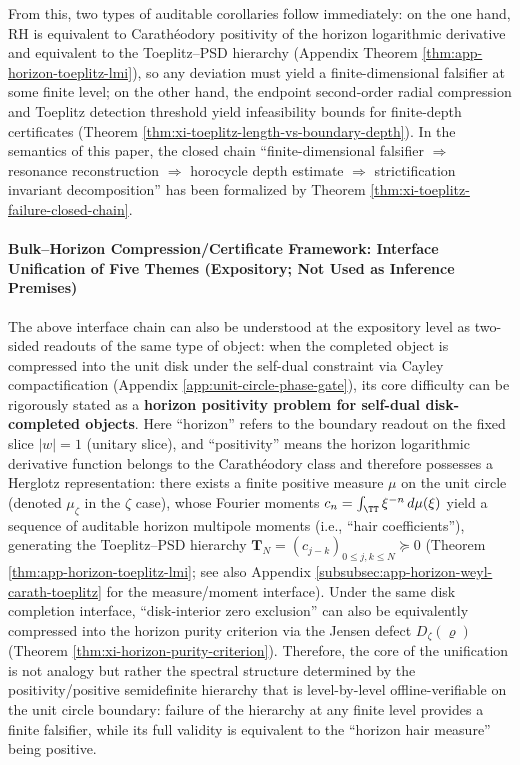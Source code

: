 From this, two types of auditable corollaries follow immediately: on the one hand, RH is equivalent to Carath\'eodory positivity of the horizon logarithmic derivative and equivalent to the Toeplitz--PSD hierarchy (Appendix Theorem \ref{thm:app-horizon-toeplitz-lmi}), so any deviation must yield a finite-dimensional falsifier at some finite level; on the other hand, the endpoint second-order radial compression and Toeplitz detection threshold yield infeasibility bounds for finite-depth certificates (Theorem \ref{thm:xi-toeplitz-length-vs-boundary-depth}).
In the semantics of this paper, the closed chain ``finite-dimensional falsifier \(\Rightarrow\) resonance reconstruction \(\Rightarrow\) horocycle depth estimate \(\Rightarrow\) strictification invariant decomposition'' has been formalized by Theorem \ref{thm:xi-toeplitz-failure-closed-chain}.

\paragraph{Bulk--Horizon Compression/Certificate Framework: Interface Unification of Five Themes (Expository; Not Used as Inference Premises)}
The above interface chain can also be understood at the expository level as two-sided readouts of the same type of object: when the completed object is compressed into the unit disk under the self-dual constraint via Cayley compactification (Appendix \ref{app:unit-circle-phase-gate}), its core difficulty can be rigorously stated as a \textbf{horizon positivity problem for self-dual disk-completed objects}.
Here ``horizon'' refers to the boundary readout on the fixed slice \(|w|=1\) (unitary slice), and ``positivity'' means the horizon logarithmic derivative function belongs to the Carath\'eodory class and therefore possesses a Herglotz representation: there exists a finite positive measure \(\mu\) on the unit circle (denoted \(\mu_{\zeta}\) in the \(\zeta\) case), whose Fourier moments
\(
c_n=\int_{\TT}\xi^{-n}\,d\mu(\xi)
\)
yield a sequence of auditable horizon multipole moments (i.e., ``hair coefficients''), generating the Toeplitz--PSD hierarchy
\(
\mathbf{T}_N=(c_{j-k})_{0\le j,k\le N}\succeq 0
\)
(Theorem \ref{thm:app-horizon-toeplitz-lmi}; see also Appendix \ref{subsubsec:app-horizon-weyl-carath-toeplitz} for the measure/moment interface).
Under the same disk completion interface, ``disk-interior zero exclusion'' can also be equivalently compressed into the horizon purity criterion via the Jensen defect \(D_{\zeta}(\varrho)\) (Theorem \ref{thm:xi-horizon-purity-criterion}).
Therefore, the core of the unification is not analogy but rather the spectral structure determined by the positivity/positive semidefinite hierarchy that is level-by-level offline-verifiable on the unit circle boundary: failure of the hierarchy at any finite level provides a finite falsifier, while its full validity is equivalent to the ``horizon hair measure'' being positive.


